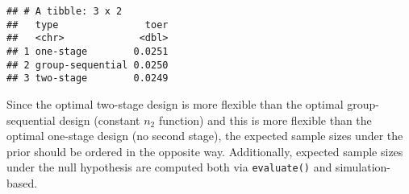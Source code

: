 \documentclass[
]{book}
\newenvironment{Shaded}{\begin{snugshade}}{\end{snugshade}}
\newcommand{\AttributeTok}[1]{\textcolor[rgb]{0.77,0.63,0.00}{#1}}
\newcommand{\CommentTok}[1]{\textcolor[rgb]{0.56,0.35,0.01}{\textit{#1}}}
\newcommand{\DecValTok}[1]{\textcolor[rgb]{0.00,0.00,0.81}{#1}}
\newcommand{\FunctionTok}[1]{\textcolor[rgb]{0.00,0.00,0.00}{#1}}
\newcommand{\NormalTok}[1]{#1}
\newcommand{\OtherTok}[1]{\textcolor[rgb]{0.56,0.35,0.01}{#1}}
\newcommand{\SpecialCharTok}[1]{\textcolor[rgb]{0.00,0.00,0.00}{#1}}
\begin{document}
\begin{verbatim}
## # A tibble: 3 x 2
##   type               toer
##   <chr>             <dbl>
## 1 one-stage        0.0251
## 2 group-sequential 0.0250
## 3 two-stage        0.0249
\end{verbatim}

Since the optimal two-stage design is more flexible than the optimal
group-sequential design (constant \(n_2\) function) and this is
more flexible than the optimal one-stage design (no second stage),
the expected sample sizes under the prior should be ordered in the opposite way.
Additionally, expected sample sizes under the null hypothesis
are computed both via \texttt{evaluate()} and simulation-based.

\begin{Shaded}
\end{Shaded}
\end{document}
